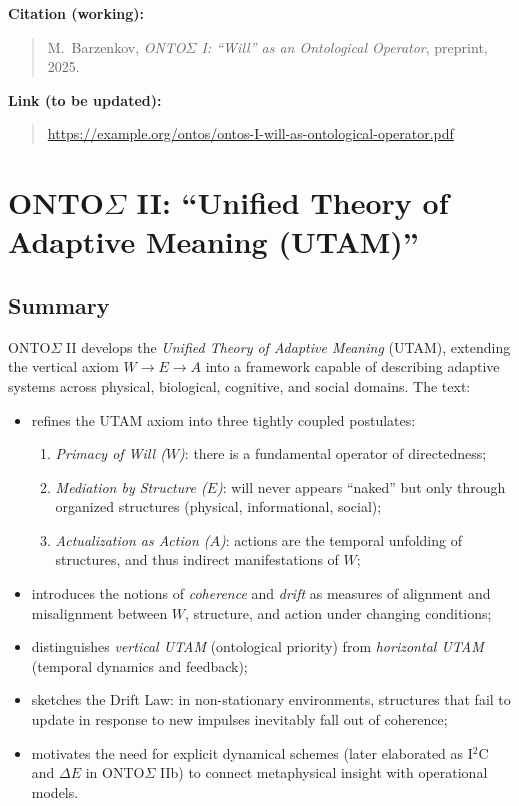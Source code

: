 \documentclass[12pt,a4paper]{report}
\newcommand{\Will}{W}
\newcommand{\Struct}{E}
\newcommand{\Act}{A}
\begin{document}
\noindent\textbf{Citation (working):}
\begin{quote}
M.\ Barzenkov, \emph{ONTO$\Sigma$ I: ``Will'' as an Ontological Operator}, preprint, 2025.
\end{quote}

\noindent\textbf{Link (to be updated):}
\begin{quote}
\url{https://example.org/ontos/ontos-I-will-as-ontological-operator.pdf}
\end{quote}

\vspace{1em}

\section*{ONTO$\Sigma$ II: ``Unified Theory of Adaptive Meaning (UTAM)''}

\subsection*{Summary}

ONTO$\Sigma$ II develops the \emph{Unified Theory of Adaptive Meaning} (UTAM), extending the vertical axiom \(\Will \to \Struct \to \Act\) into a framework capable of describing adaptive systems across physical, biological, cognitive, and social domains. The text:

\begin{itemize}[leftmargin=2em]
    \item refines the UTAM axiom into three tightly coupled postulates:
    \begin{enumerate}
        \item \emph{Primacy of Will (\(\Will\))}: there is a fundamental operator of directedness;
        \item \emph{Mediation by Structure (\(\Struct\))}: will never appears ``naked'' but only through organized structures (physical, informational, social);
        \item \emph{Actualization as Action (\(\Act\))}: actions are the temporal unfolding of structures, and thus indirect manifestations of \(\Will\);
    \end{enumerate}
    \item introduces the notions of \emph{coherence} and \emph{drift} as measures of alignment and misalignment between \(\Will\), structure, and action under changing conditions;
    \item distinguishes \emph{vertical UTAM} (ontological priority) from \emph{horizontal UTAM} (temporal dynamics and feedback);
    \item sketches the Drift Law: in non-stationary environments, structures that fail to update in response to new impulses inevitably fall out of coherence;
    \item motivates the need for explicit dynamical schemes (later elaborated as I$^2$C and $\Delta E$ in ONTO$\Sigma$ IIb) to connect metaphysical insight with operational models.
\end{itemize}
\end{document}
